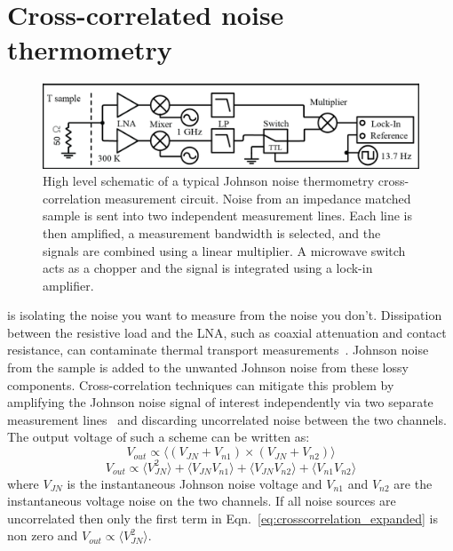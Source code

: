 \section{Cross-correlated noise thermometry}
\begin{figure}
\centering
\includegraphics[width=\textwidth]{figures/Johnson_noise_thermometry/Schematic_Crosscorrelation.png}
\caption[JNT crosscorrelation schematic]{High level schematic of a typical Johnson noise thermometry cross-correlation measurement circuit. Noise from an impedance matched sample is sent into two independent measurement lines. Each line is then amplified, a measurement bandwidth is selected, and the signals are combined using a linear multiplier. A microwave switch acts as a chopper and the signal is integrated using a lock-in amplifier.}
\label{fig:schematic_crosscorrelation}
\end{figure}
 is isolating the noise you want to measure from the noise you don't. Dissipation between the resistive load and the LNA, such as coaxial attenuation and contact resistance, can contaminate thermal transport measurements~\cite{white_status_1996, glattli_noise_1997}. Johnson noise from the sample is added to the unwanted Johnson noise from these lossy components. Cross-correlation techniques can mitigate this problem by amplifying the Johnson noise signal of interest independently via two separate measurement lines~\cite{glattli_noise_1997, dicarlo_system_2006, henny_1/3-shot-noise_1999, brophy_correlatoramplifier_1965, klein_measurement_1979} and discarding uncorrelated noise between the two channels. The output voltage of such a scheme can be written as:
\begin{equation}
V_{out}\propto\langle\left(V_{JN}+V_{n1}\right)\times\left(V_{JN}+V_{n2}\right)\rangle 
\end{equation}
\begin{equation}\label{eq:crosscorrelation_expanded}
V_{out}\propto\langle V_{JN}^2\rangle + \langle V_{JN}V_{n1}\rangle+\langle V_{JN}V_{n2}\rangle+\langle V_{n1}V_{n2}\rangle
\end{equation}
where $V_{JN}$ is the instantaneous Johnson noise voltage and $V_{n1}$ and $V_{n2}$ are the instantaneous voltage noise on the two channels. If all noise sources are uncorrelated then only the first term in Eqn.~\ref{eq:crosscorrelation_expanded} is non zero and ${V_{out}\propto\langle V_{JN}^2\rangle}$.

